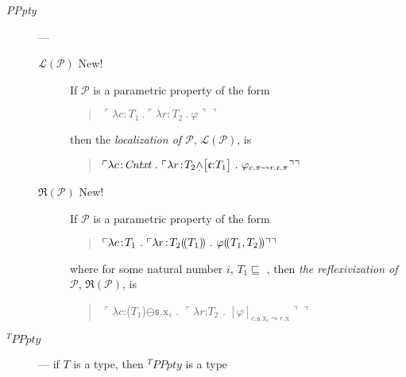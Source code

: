 \begin{description}
      \item[\textnormal{\textit{PPpty}}] --- 

        \begin{description}

        
        \item[\textnormal{$\mathcal{L}(\mathcal{P})$} New!] \mbox{}

          If $\mathcal{P}$ is a parametric property of the form
  \begin{quote}
    $\ulcorner\lambda c\!:\!T_1\ . \ulcorner\lambda r\!:\!T_2\ .\
    \varphi\urcorner\urcorner$
  \end{quote}
  then the \textit{localization of $\mathcal{P}$},
  $\mathcal{L}(\mathcal{P})$, is
  \begin{quote}
    $\ulcorner\lambda c\!:\!\textit{Cntxt}\ .\ \ulcorner\lambda
    r\!:\!T_2\text{\d{$\wedge$}\smallrecord{
        \smalltfield{$\mathfrak{c}$}{$T_1$}}}\ .\ 
    \varphi_{c.\pi\leadsto r.\mathfrak{c}.\pi}\urcorner\urcorner$
  \end{quote}

  
\item[\textnormal{$\mathfrak{R}(\mathcal{P})$} New!] \mbox{}

  If $\mathcal{P}$ is a parametric property of the form
  \begin{quote}
    $\ulcorner\lambda c\!:\!T_1\ .\ \ulcorner\lambda
    r\!:\!T_2\dep{T_1}\ .\ \varphi\dep{T_1,T_2}\urcorner\urcorner$
  \end{quote}
  where for some natural number $i$, $T_1\sqsubseteq$ \smallrecord{
    \smalltfield{$\mathfrak{r}$}{\smallrecord{
        \smalltfield{x$_i$}{\textit{Ind}}}}}, then \textit{the reflexivization
  of} $\mathcal{P}$, $\mathfrak{R}(\mathcal{P})$, is
  \begin{quote}
    $\ulcorner\lambda c$:($T_1$\fbox{\d{$\wedge$}})$\ominus\mathfrak{s}.\text{x}_i$
    . $\ulcorner\lambda r$:$T_2$
    . $[\varphi]_{c.\mathfrak{s}.\text{x}_i\leadsto
      r.\text{x}}\urcorner\urcorner$
  \end{quote}
  
\end{description}
        
      \item[\textnormal{$^T\textit{PPpty}$}] --- if $T$ is a
        type, then $^T\textit{PPpty}$ is a type


\end{description}
